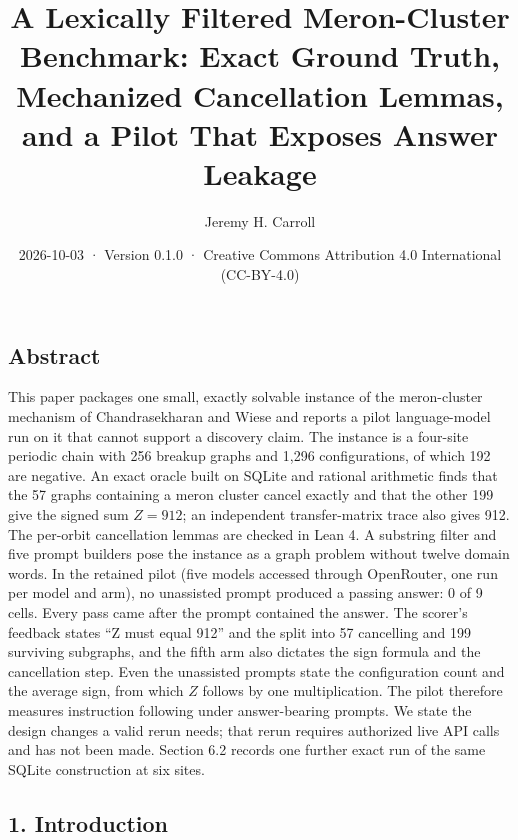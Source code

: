 \documentclass[
  11pt,
]{article}
\title{A Lexically Filtered Meron-Cluster Benchmark: Exact Ground Truth,
Mechanized Cancellation Lemmas, and a Pilot That Exposes Answer Leakage}
\author{Jeremy H. Carroll}
\date{2026-10-03 · Version 0.1.0 · Creative Commons Attribution 4.0
International (CC-BY-4.0)}
\begin{document}
\makeatletter
\begin{center}
{\LARGE \@title\par}
\vspace{0.8em}
{\normalsize \@author\par}
\vspace{0.5em}
{\small \@date\par}
\end{center}
\makeatother

\subsection{Abstract}\label{abstract}

This paper packages one small, exactly solvable instance of the
meron-cluster mechanism of Chandrasekharan and Wiese and reports a pilot
language-model run on it that cannot support a discovery claim. The
instance is a four-site periodic chain with 256 breakup graphs and 1,296
configurations, of which 192 are negative. An exact oracle built on
SQLite and rational arithmetic finds that the 57 graphs containing a
meron cluster cancel exactly and that the other 199 give the signed sum
\(Z = 912\); an independent transfer-matrix trace also gives 912. The
per-orbit cancellation lemmas are checked in Lean 4. A substring filter
and five prompt builders pose the instance as a graph problem without
twelve domain words. In the retained pilot (five models accessed through
OpenRouter, one run per model and arm), no unassisted prompt produced a
passing answer: 0 of 9 cells. Every pass came after the prompt contained
the answer. The scorer's feedback states ``Z must equal 912'' and the
split into 57 cancelling and 199 surviving subgraphs, and the fifth arm
also dictates the sign formula and the cancellation step. Even the
unassisted prompts state the configuration count and the average sign,
from which \(Z\) follows by one multiplication. The pilot therefore
measures instruction following under answer-bearing prompts. We state
the design changes a valid rerun needs; that rerun requires authorized
live API calls and has not been made. Section 6.2 records one further
exact run of the same SQLite construction at six sites.

\subsection{1. Introduction}\label{introduction}
\end{document}
